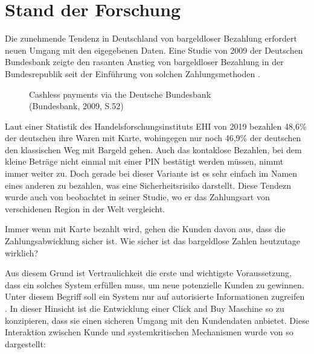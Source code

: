\section{Stand der Forschung}


Die zunehmende Tendenz in Deutschland von bargeldloser Bezahlung erfordert neuen Umgang mit den 
eigegebenen Daten. Eine Studie von 2009 der Deutschen Bundesbank zeigte den rasanten Anstieg von 
bargeldloser Bezahlung in der Bundesrepublik seit der Einführung von solchen Zahlungsmethoden 
\cite{refrep:DBCP}.

\begin{figure}[htb]
    \caption{Cashless payments via the Deutsche Bundesbank\\ (Bundesbank, 2009, S.52)}
    \label{fig:refrep_DB}
\end{figure}


Laut einer Statistik des Handelsforschungsinstituts EHI von 2019 \cite{refart:KSDL} bezahlen 48,6\% 
der deutschen ihre Waren mit Karte, wohingegen nur noch 46,9\% der deutschen den klassischen 
Weg mit Bargeld gehen. Auch das kontaklose Bezahlen, bei dem kleine Beträge nicht einmal mit einer 
PIN bestätigt werden müssen, nimmt immer weiter zu. Doch gerade bei dieser Variante ist es sehr einfach
im Namen eines anderen zu bezahlen, was eine Sicherheitsrisiko darstellt. Diese Tendezn wurde auch
von \cite{refart:TDMP} beobachtet in seiner Studie, wo er das Zahlungsart von verschidenen Region in der Welt 
vergleicht. 


Immer wenn mit Karte bezahlt wird, gehen die Kunden davon aus, dass die Zahlungsabwicklung sicher ist. 
Wie sicher ist das bargeldlose Zahlen heutzutage wirklich? 


Aus diesem Grund ist Vertraulichkeit die erste und wichtigste Voraussetzung, dass ein solches System 
erfüllen muss, um neue potenzielle Kunden zu gewinnen. Unter diesem Begriff soll ein System nur auf 
autorisierte Informationen zugreifen \cite{refbook:SWIS}. In dieser Hinsicht ist die Entwicklung 
einer Click and Buy Maschine so zu konzipieren, dass sie einen sicheren Umgang mit den Kundendaten
anbietet. Diese Interaktion zwischen Kunde und systemkritischen Mechanismen wurde von \cite{refart:HARE}
so dargestellt:

